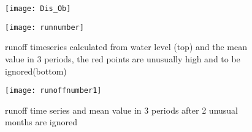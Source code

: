 \begin{figure}[htbp]
	\centering
	\begin{minipage}[t]{0.9\textwidth}
		\centering
		\texttt{[image: Dis\_Ob]} %
	\end{minipage}
	\begin{minipage}[t]{0.9\textwidth}
		\centering
		\texttt{[image: runnumber]} %
	\end{minipage}
	\caption{runoff timeseries calculated from water level (top) and the mean value in 3 periods, the red points are unusually high and to be ignored(bottom)}
	\label{fig:runoff}
\end{figure}
\begin{figure}[htbp]
	\centering
		\texttt{[image: runoffnumber1]} %
	\caption{runoff time series and mean value in 3 periods after 2 unusual months are ignored} 
	\label{fig:rnum2}
\end{figure}\\
\clearpage

